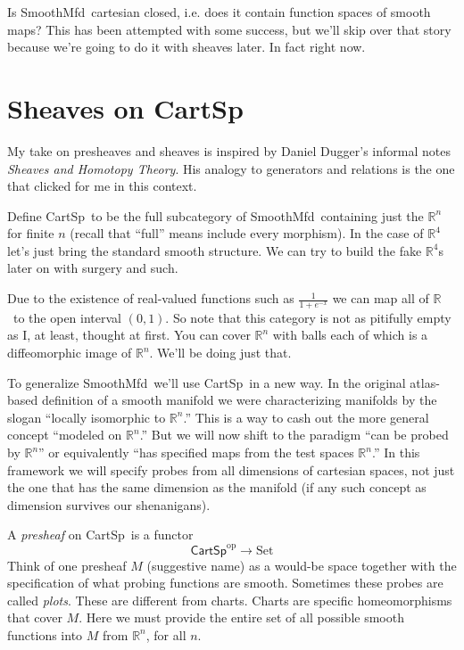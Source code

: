 \documentclass[12pt]{article}
\newcommand{\rr}{\ensuremath{\mathbb{R}}}
\newcommand{\smfd}{\textsf{SmoothMfd}}
\newcommand{\cart}{\textsf{CartSp}}
\begin{document}
Is \smfd\ cartesian closed, i.e. does it contain function spaces of smooth maps? This has been attempted with some success, but we'll skip over that story because we're going to do it with sheaves later. In fact right now.

\section{Sheaves on \cart}\label{sec:sheaves}

My take on presheaves and sheaves is inspired by Daniel Dugger's informal notes \emph{Sheaves and Homotopy Theory}\cite{dugger_sheaves_1999}. His analogy to generators and relations is the one that clicked for me in this context.

Define \cart\ to be the full subcategory of \smfd\ containing just the $\rr^n$ for finite $n$ (recall that ``full'' means include every morphism). In the case of $\rr^4$ let's just bring the standard smooth structure. We can try to build the fake $\rr^4$s later on with surgery and such.

Due to the existence of real-valued functions such as $\frac{1}{1+e^{-x}}$ we can map all of \rr\ to the open interval $(0,1)$. So note that this category is not as pitifully empty as I, at least, thought at first. You can cover $\rr^n$ with balls each of which is a diffeomorphic image of $\rr^n$. We'll be doing just that.

To generalize \smfd\ we'll use \cart\ in a new way. In the original atlas-based definition of a smooth manifold we were characterizing manifolds by the slogan ``locally isomorphic to $\rr^n$.'' This is a way to cash out the more general concept ``modeled on $\rr^n$.'' But we will now shift to the paradigm ``can be probed by $\rr^n$'' or equivalently ``has specified maps from the test spaces $\rr^n$.'' In this framework we will specify probes from all dimensions of cartesian spaces, not just the one that has the same dimension as the manifold (if any such concept as dimension survives our shenanigans).

A \emph{presheaf} on \cart\ is a functor $$\cart^{\mathrm{op}}\to \mathrm{Set}$$ Think of one presheaf $M$ (suggestive name) as a would-be space together with the specification of what probing functions are smooth. Sometimes these probes are called \emph{plots}. These are different from charts. Charts are specific homeomorphisms that cover $M$. Here we must provide the entire set of all possible smooth functions into $M$ from $\rr^n$, for all $n$.
\end{document}
